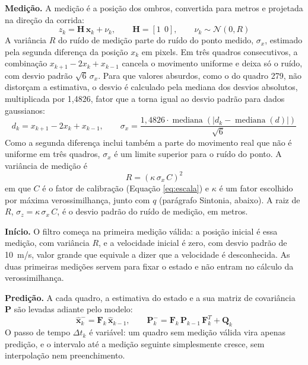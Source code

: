 \documentclass[
    12pt,               %
    openright,          %
    twoside,            %
    a4paper,            %
    chapter=TITLE,      %
    english,            %
    brazil              %
    ]{abntex2}
\begin{document}
\textbf{Medição.} A medição é a posição dos ombros, convertida para metros e projetada na direção da corrida:
\begin{equation} \label{eq:kalman_medicao}
    z_k = \mathbf{H}\,\mathbf{x}_k + \nu_k, \qquad \mathbf{H} = [1\ \ 0], \qquad \nu_k \sim \mathcal{N}(0, R)
\end{equation}
A variância $R$ do ruído de medição parte do ruído do ponto medido, $\sigma_x$, estimado pela segunda diferença da posição $x_k$ em pixels. Em três quadros consecutivos, a combinação $x_{k+1} - 2x_k + x_{k-1}$ cancela o movimento uniforme e deixa só o ruído, com desvio padrão $\sqrt{6}\,\sigma_x$. Para que valores absurdos, como o do quadro 279, não distorçam a estimativa, o desvio é calculado pela mediana dos desvios absolutos, multiplicada por 1,4826, fator que a torna igual ao desvio padrão para dados gaussianos:
\begin{equation} \label{eq:sigma_x}
    d_k = x_{k+1} - 2x_k + x_{k-1}, \qquad
    \sigma_x = \frac{1{,}4826 \cdot \operatorname{mediana}\left(\left|d_k - \operatorname{mediana}(d)\right|\right)}{\sqrt{6}}
\end{equation}
Como a segunda diferença inclui também a parte do movimento real que não é uniforme em três quadros, $\sigma_x$ é um limite superior para o ruído do ponto. A variância de medição é
\begin{equation} \label{eq:kalman_r}
    R = (\kappa\,\sigma_x\,C)^2
\end{equation}
em que $C$ é o fator de calibração (Equação \ref{eq:escala}) e $\kappa$ é um fator escolhido por máxima verossimilhança, junto com $q$ (parágrafo Sintonia, abaixo). A raiz de $R$, $\sigma_z = \kappa\,\sigma_x\,C$, é o desvio padrão do ruído de medição, em metros.

\textbf{Início.} O filtro começa na primeira medição válida: a posição inicial é essa medição, com variância $R$, e a velocidade inicial é zero, com desvio padrão de 10~m/s, valor grande que equivale a dizer que a velocidade é desconhecida. As duas primeiras medições servem para fixar o estado e não entram no cálculo da verossimilhança.

\textbf{Predição.} A cada quadro, a estimativa do estado e a sua matriz de covariância $\mathbf{P}$ são levadas adiante pelo modelo:
\begin{equation} \label{eq:kalman_predicao}
    \hat{\mathbf{x}}_k^- = \mathbf{F}_k\,\hat{\mathbf{x}}_{k-1}, \qquad
    \mathbf{P}_k^- = \mathbf{F}_k\,\mathbf{P}_{k-1}\,\mathbf{F}_k^T + \mathbf{Q}_k
\end{equation}
O passo de tempo $\Delta t_k$ é variável: um quadro sem medição válida vira apenas predição, e o intervalo até a medição seguinte simplesmente cresce, sem interpolação nem preenchimento.
\end{document}

